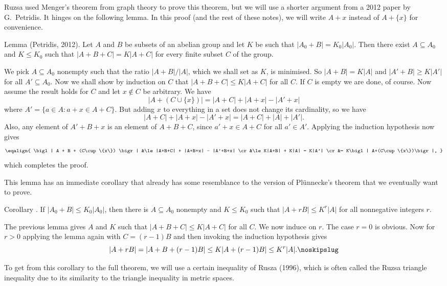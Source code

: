 Ruzsa used Menger's theorem from graph theory to prove this theorem, but we will use a shorter
argument from a 2012 paper by G.~Petridis. It hinges on the following lemma. In this proof (and the
rest of these notes), we will write $A+x$ instead of $A+\{x\}$ for convenience.

\edef\lempetridis{\the\thmcount}
\parenproclaim Lemma {\advthm} (Petridis, {\rm 2012}). Let $A$ and $B$ be subsets of an abelian
group and let $K$ be such that $|A_0+B| = K_0|A_0|$. Then there exist $A\subseteq A_0$ and
$K\le K_0$ such that $|A+B+C| = K|A+C|$ for every finite subset $C$ of the group.

\proof We pick $A\subseteq A_0$ nonempty such that the ratio $|A+B|/|A|$, which we shall
set as $K$, is minimised. So $|A+B| = K|A|$ and $|A'+B|\ge K|A'|$ for all $A'\subseteq A_0$.
Now we shall show by induction on $C$ that $|A+B+C|\le K|A+C|$ for all $C$. If $C$ is empty we
are done, of course. Now assume the result holds for $C$ and let $x\notin C$ be arbitrary. We have
$$\bigl| A+(C\cup \{x\}) \bigr| = |A+C| + |A+x| - |A'+x|$$
where $A' = \{a\in A : a+x \in A+C\}$. But adding $x$ to everything in a set does not change its
cardinality, so we have
$$|A+C| + |A+x|-|A'+x| = |A+C| + |A| + |A'|.$$
Also, any element of $A'+B+x$ is an element of $A+B+C$, since $a'+x\in A+C$ for all $a'\in A'$.
Applying the induction hypothesis now gives
$$\eqalign{
\bigl| A + B + (C\cup \{x\}) \bigr| &\le |A+B+C| + |A+B+x| - |A'+B+x| \cr
&\le K|A+B| + K|A| = K|A'| \cr
&= K\bigl| A+(C\cup \{x\})\bigr|,
}$$
which completes the proof.\slug

This lemma has an immediate corollary that already has some resemblance to the version of Pl\"unnecke's
theorem that we eventually want to prove.

\proclaim Corollary {\advthm}. If $|A_0 + B|\le K_0|A_0|$, then there is $A\subseteq A_0$ nonempty
and $K\le K_0$ such that $|A+rB| \le K^r |A|$ for all nonnegative integers $r$.

\proof The previous lemma gives $A$ and $K$ such that $|A+B+C|\le K|A+C|$ for all $C$. We now induce
on $r$. The case $r=0$ is obvious. Now for $r>0$ applying the lemma again with $C = (r-1)B$ and
then invoking the induction hypothesis gives
$$|A+rB| = |A+B+(r-1)B| \le K|A+(r-1)B| \le K^r|A|.\noskipslug$$

To get from this corollary to the full theorem, we will use a certain inequality of Rusza (1996), which
is often called the Ruzsa triangle inequality due to its similarity to the triangle inequality in
metric spaces.

